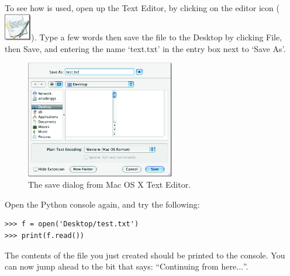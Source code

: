 \begin{MAC}
To see how  is used, open up the Text Editor, by clicking on the editor icon (\includegraphics*[width=12mm]{eps/textedit-icon.eps}).  Type a few words then save the file to the Desktop by clicking File, then Save, and entering the name `text.txt' in the entry box next to `Save As'.

\begin{figure}
\begin{center}
\includegraphics[width=65mm]{eps/figure18.eps}
\end{center}
\caption{The save dialog from Mac OS X Text Editor.}\label{fig18}
\end{figure}

Open the Python console again, and try the following:

\begin{listing}
\begin{verbatim}
>>> f = open('Desktop/test.txt')
>>> print(f.read())
\end{verbatim}
\end{listing}

The contents of the file you just created should be printed to the console.  You can now jump ahead to the bit that says: ``Continuing from here$\ldots$''.
\end{MAC}

